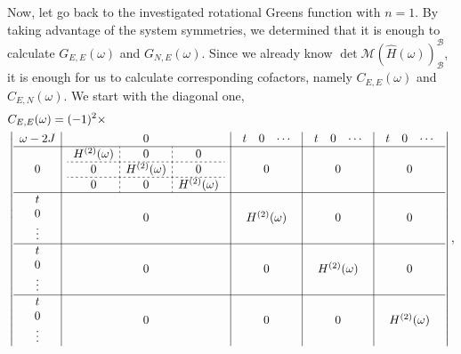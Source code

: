 \documentclass{article}
\begin{document}
Now, let go back to the investigated rotational Greens function with $n=1$. By taking advantage of the system symmetries, we determined that it is enough to calculate $G_{E, E}(\omega)$ and $G_{N, E}(\omega)$. Since we already know $\det \mathcal{M}(\hat{H}(\omega))_\mathcal{B}^\mathcal{B}$, it is enough for us to calculate corresponding cofactors, namely $C_{E,E}(\omega)$ and $C_{E, N}(\omega)$. We start with the diagonal one,
\begin{equation}
\begin{split}
    &C_{E,E}(\omega) = (-1)^2 \times \\ 
    &\left\vert
    \begin{array}{c|c|c|c|c}
        \omega - 2J & 0 &
            \begin{array}{ccc} t & 0 & \cdots \end{array} &
            \begin{array}{ccc} t & 0 & \cdots \end{array} &
            \begin{array}{ccc} t & 0 & \cdots \end{array} \\
        \hline
        0 & 
            \begin{array}{c;{2pt/2pt}c;{2pt/2pt}c}
                H^{(2)}(\omega) & 0 & 0 \\
                \hdashline[2pt/2pt]
                0 & H^{(2)}(\omega) & 0  \\
                \hdashline[2pt/2pt]
                0 & 0 & H^{(2)}(\omega)
            \end{array} & 0 & 0 & 0 \\
        \hline
        \begin{array}{c} t \\ 0 \\ \vdots \end{array} & 
            0 & H^{(2)}(\omega) & 0 & 0 \\
        \hline
        \begin{array}{c} t \\ 0 \\ \vdots \end{array} & 
            0 & 0 & H^{(2)}(\omega) & 0 \\
        \hline
        \begin{array}{c} t \\ 0 \\ \vdots \end{array} & 
            0 & 0 & 0 & H^{(2)}(\omega)
    \end{array}
    \right\vert,
\end{split}
\end{equation}
\end{document}
